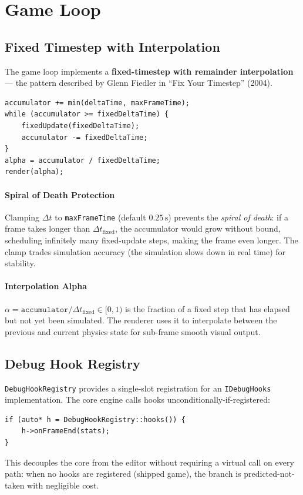 \chapter{Game Loop}

\section{Fixed Timestep with Interpolation}

The game loop implements a \textbf{fixed-timestep with remainder
interpolation} --- the pattern described by Glenn Fiedler in
``Fix Your Timestep'' (2004).

\begin{lstlisting}[caption={Game loop tick}]
accumulator += min(deltaTime, maxFrameTime);
while (accumulator >= fixedDeltaTime) {
    fixedUpdate(fixedDeltaTime);
    accumulator -= fixedDeltaTime;
}
alpha = accumulator / fixedDeltaTime;
render(alpha);
\end{lstlisting}

\subsubsection{Spiral of Death Protection}

Clamping $\Delta t$ to \texttt{maxFrameTime} (default $0.25\,\text{s}$)
prevents the \emph{spiral of death}: if a frame takes longer than
$\Delta t_\text{fixed}$, the accumulator would grow without bound,
scheduling infinitely many fixed-update steps, making the frame even
longer. The clamp trades simulation accuracy (the simulation slows
down in real time) for stability.

\subsubsection{Interpolation Alpha}

$\alpha = \texttt{accumulator} / \Delta t_\text{fixed} \in [0, 1)$
is the fraction of a fixed step that has elapsed but not yet been
simulated. The renderer uses it to interpolate between the previous
and current physics state for sub-frame smooth visual output.

\section{Debug Hook Registry}

\texttt{DebugHookRegistry} provides a single-slot registration for an
\texttt{IDebugHooks} implementation. The core engine calls hooks
unconditionally-if-registered:

\begin{lstlisting}[caption={Zero-overhead hook call pattern}]
if (auto* h = DebugHookRegistry::hooks()) {
    h->onFrameEnd(stats);
}
\end{lstlisting}

This decouples the core from the editor without requiring a virtual
call on every path: when no hooks are registered (shipped game), the
branch is predicted-not-taken with negligible cost.
